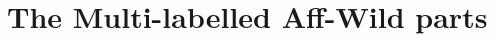 \documentclass[a4paper, 10pt, conference]{ieeeconf}      %
\begin{document}
\begin{comment}
\begin{figure}[h]
   \centering
      \texttt{[image: AU\_total\_dist.png]}
      \caption{Pie chart of the distribution of Action Units in whole dataset}
      \label{fig:au_total_dist}
\end{figure} 


\begin{figure}[h]
\begin{tabular}{cc}
  \texttt{[image: au1\_va.png]} &   \texttt{[image: au2\_va.png]} \\
 \texttt{[image: au4\_va.png]} &   \texttt{[image: au6\_va.png]} \\
   \texttt{[image: au12\_va.png]} &   \texttt{[image: au15\_va.png]} \\
 \texttt{[image: au20\_va.png]} &   \texttt{[image: au25\_va.png]} 
\end{tabular}
\caption{Graphs of the distribution of each Action Unit in the VA-Space}
\label{fig:au_dist_va}
\end{figure}


\begin{figure}
    \centering
    \texttt{[image: annotation\_software.png]}
    \caption{The GUI for the Action Unit annotation software. The GUI for the basic expression software was exactly the same; their difference  being the titles in the annotation tabs}
    \label{fig:annotation_interface}
\end{figure}
\end{comment}






\section{The Multi-labelled  Aff-Wild parts}
\end{document}
